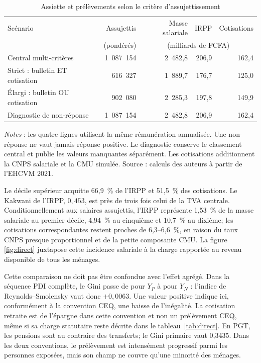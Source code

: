 \documentclass[11pt,a4paper]{article}
\begin{document}
\begin{table}[t]
\centering
\begin{threeparttable}
\caption{Assiette et prélèvements selon le critère d'assujettissement}
\label{tab:direct-scenarios}
\begin{tabular}{lrrrr}
\toprule
Scénario & Assujettis & Masse salariale & IRPP & Cotisations \\
 & (pondérés) & \multicolumn{3}{c}{(milliards de FCFA)} \\
\midrule
Central multi-critères & 1~087~154 & 2~482,8 & 206,9 & 162,4 \\
Strict : bulletin ET cotisation & 616~327 & 1~889,7 & 176,7 & 125,0 \\
Élargi : bulletin OU cotisation & 902~080 & 2~285,3 & 197,8 & 149,9 \\
Diagnostic de non-réponse & 1~087~154 & 2~482,8 & 206,9 & 162,4 \\
\bottomrule
\end{tabular}
\begin{tablenotes}\footnotesize
\item \emph{Notes} : les quatre lignes utilisent la même rémunération
annualisée. Une non-réponse ne vaut jamais réponse positive. Le diagnostic
conserve le classement central et publie les valeurs manquantes séparément.
Les cotisations additionnent la CNPS salariale et la CMU simulée. Source :
calculs des auteurs à partir de l'EHCVM 2021.
\end{tablenotes}
\end{threeparttable}
\end{table}

Le décile supérieur acquitte 66,9~\% de l'IRPP et 51,5~\% des cotisations. Le
Kakwani de l'IRPP, $0,453$, est près de trois fois celui de la TVA centrale.
Conditionnellement aux salaires assujettis, l'IRPP représente 1,53~\% de la
masse salariale au premier décile, 4,94~\% au cinquième et 10,7~\% au dixième;
les cotisations correspondantes restent proches de 6,3--6,6~\%, en raison du
taux CNPS presque proportionnel et de la petite composante CMU. La figure
\ref{fig:direct} juxtapose cette incidence salariale à la charge rapportée au
revenu disponible de tous les ménages.

Cette comparaison ne doit pas être confondue avec l'effet agrégé. Dans la
séquence PDI complète, le Gini passe de \GiniPrimaire{} pour $Y_P$ à \GiniNetMarche{} pour $Y_N$ :
l'indice de Reynolds--Smolensky vaut donc $+0,0063$. Une valeur positive indique
ici, conformément à la convention CEQ, une baisse de l'inégalité. La cotisation
retraite est de l'épargne dans cette convention et non un prélèvement CEQ, même
si sa charge statutaire reste décrite dans le tableau~\ref{tab:direct}. En PGT,
les pensions sont au contraire des transferts; le Gini primaire vaut 0,3435.
Dans les deux conventions, le prélèvement est intensément progressif parmi les
personnes exposées, mais son champ ne couvre qu'une minorité des ménages.
\end{document}
